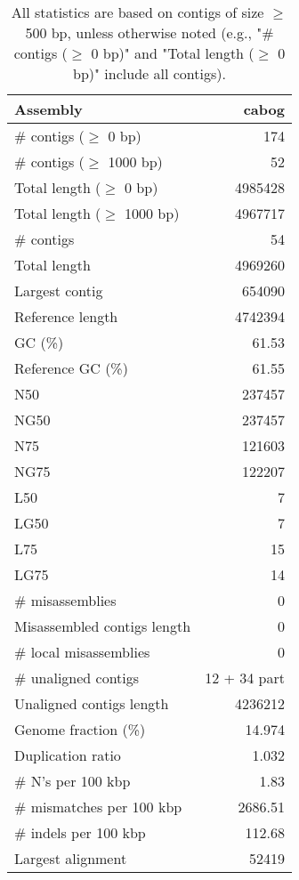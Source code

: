 \documentclass[12pt,a4paper]{article}
\begin{document}
\begin{table}[ht]
\begin{center}
\caption{All statistics are based on contigs of size $\geq$ 500 bp, unless otherwise noted (e.g., "\# contigs ($\geq$ 0 bp)" and "Total length ($\geq$ 0 bp)" include all contigs).}
\begin{tabular}{|l*{1}{|r}|}
\hline
Assembly & cabog \\ \hline
\# contigs ($\geq$ 0 bp) & 174 \\ \hline
\# contigs ($\geq$ 1000 bp) & 52 \\ \hline
Total length ($\geq$ 0 bp) & 4985428 \\ \hline
Total length ($\geq$ 1000 bp) & 4967717 \\ \hline
\# contigs & 54 \\ \hline
Total length & 4969260 \\ \hline
Largest contig & 654090 \\ \hline
Reference length & 4742394 \\ \hline
GC (\%) & 61.53 \\ \hline
Reference GC (\%) & 61.55 \\ \hline
N50 & 237457 \\ \hline
NG50 & 237457 \\ \hline
N75 & 121603 \\ \hline
NG75 & 122207 \\ \hline
L50 & 7 \\ \hline
LG50 & 7 \\ \hline
L75 & 15 \\ \hline
LG75 & 14 \\ \hline
\# misassemblies & 0 \\ \hline
Misassembled contigs length & 0 \\ \hline
\# local misassemblies & 0 \\ \hline
\# unaligned contigs & 12 + 34 part \\ \hline
Unaligned contigs length & 4236212 \\ \hline
Genome fraction (\%) & 14.974 \\ \hline
Duplication ratio & 1.032 \\ \hline
\# N's per 100 kbp & 1.83 \\ \hline
\# mismatches per 100 kbp & 2686.51 \\ \hline
\# indels per 100 kbp & 112.68 \\ \hline
Largest alignment & 52419 \\ \hline
\end{tabular}
\end{center}
\end{table}
\end{document}

